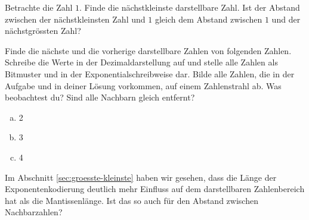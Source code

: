 \begin{aufgabe}\label{nachbarn-vorherige}
Betrachte die Zahl \(1\). Finde die nächstkleinste darstellbare Zahl. Ist der Abstand zwischen der nächstkleinsten Zahl und \(1\) gleich dem Abstand zwischen \(1\) und der nächstgrössten Zahl?
\end{aufgabe}

\begin{aufgabe}\label{nachbarn}
Finde die nächste und die vorherige darstellbare Zahlen von folgenden Zahlen. Schreibe die Werte in der Dezimaldarstellung auf und stelle alle Zahlen als Bitmuster und in der Exponentialschreibweise dar. Bilde alle Zahlen, die in der Aufgabe und in deiner Lösung vorkommen, auf einem Zahlenstrahl ab. Was beobachtest du? Sind alle Nachbarn gleich entfernt?
\begin{enumerate}[(a)]
\item 2
\item 3
\item 4
\end{enumerate}
\end{aufgabe}

Im Abschnitt \ref{sec:groesste-kleinste} haben wir gesehen, dass die Länge der Exponentenkodierung deutlich mehr Einfluss auf dem darstellbaren Zahlenbereich hat als die Mantissenlänge. Ist das so auch für den Abstand zwischen Nachbarzahlen?

